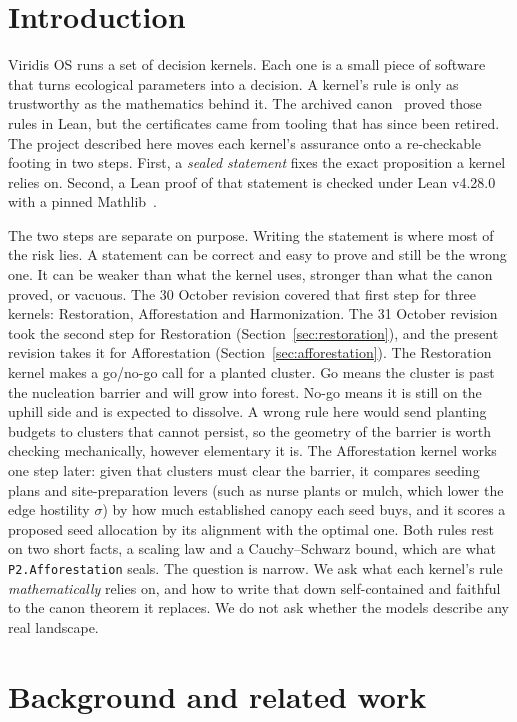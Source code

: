 \documentclass[11pt]{article}
\theoremstyle{definition}
\theoremstyle{remark}
\begin{document}
\section{Introduction}
Viridis OS runs a set of decision kernels. Each one is a small piece of software that turns ecological
parameters into a decision. A kernel's rule is only as trustworthy as the mathematics behind it.
The archived canon~\cite{HartCanon2026} proved those rules in Lean, but the certificates came from tooling that has
since been retired. The project described here moves each kernel's assurance onto a re-checkable footing in two steps.
First, a \emph{sealed statement} fixes the exact proposition a kernel relies on.
Second, a Lean proof of that statement is checked under Lean v4.28.0 with a pinned Mathlib~\cite{Mathlib2020}.

The two steps are separate on purpose. Writing the statement is where most of the risk lies.
A statement can be correct and easy to prove and still be the wrong one. It can be weaker than what the kernel uses,
stronger than what the canon proved, or vacuous. The 30 October revision covered that first step for three kernels:
Restoration, Afforestation and Harmonization.
The 31 October revision took the second step for Restoration (Section~\ref{sec:restoration}), and the present revision
takes it for Afforestation (Section~\ref{sec:afforestation}).
The Restoration kernel makes a go/no-go call for a planted cluster. Go means the cluster is past the nucleation barrier
and will grow into forest. No-go means it is still on the uphill side and is expected to dissolve.
A wrong rule here would send planting budgets to clusters that cannot persist, so the geometry of the barrier is worth
checking mechanically, however elementary it is.
The Afforestation kernel works one step later: given that clusters must clear the barrier, it compares seeding plans and
site-preparation levers (such as nurse plants or mulch, which lower the edge hostility $\sigma$) by how much established canopy each seed buys,
and it scores a proposed seed allocation by its alignment with the optimal one.
Both rules rest on two short facts, a scaling law and a Cauchy--Schwarz bound, which are what \texttt{P2.Afforestation} seals.
The question is narrow. We ask what each kernel's rule \emph{mathematically} relies on, and how to write that down
self-contained and faithful to the canon theorem it replaces. We do not ask whether the models describe any real landscape.

\section{Background and related work}
\end{document}

